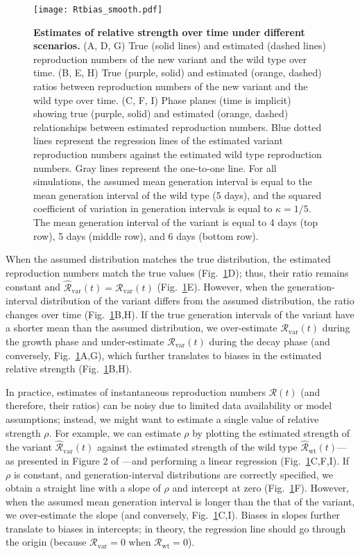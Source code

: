 \documentclass[12pt]{article}
\newcommand{\fref}[1]{Fig.~\ref{fig:#1}}
\newcommand{\vvvar}{\mathrm{var}}
\newcommand{\wwwt}{\mathrm{wt}}
\newcommand{\Rx}[1]{\ensuremath{{\mathcal R}_{#1}}\xspace}
\newcommand{\RR}{\ensuremath{{\mathcal R}}\xspace}
\newcommand{\Rw}{\Rx{\wwwt}}
\newcommand{\Rv}{\Rx{\vvvar}}
\begin{document}
\begin{figure}[!pht]
\begin{center}
\texttt{[image: Rtbias\_smooth.pdf]}
\caption{
\textbf{Estimates of relative strength over time under different scenarios.}
(A, D, G) True (solid lines) and estimated (dashed lines) reproduction numbers of the new variant and the wild type over time.
(B, E, H) True (purple, solid) and estimated (orange, dashed) ratios between reproduction numbers of the new variant and the wild type over time.
(C, F, I) Phase planes (time is implicit) showing true (purple, solid) and estimated (orange, dashed) relationships between estimated reproduction numbers.
Blue dotted lines represent the regression lines of the estimated variant reproduction numbers against the estimated wild type reproduction numbers.
Gray lines represent the one-to-one line.
For all simulations, the assumed mean generation interval is equal to the mean generation interval of the wild type (5 days), and the squared coefficient of variation in generation intervals is equal to $\kappa = 1/5$.
The mean generation interval of the variant is equal to 4 days (top row), 5 days (middle row), and 6 days (bottom row).
}
\label{fig:Rtbias}
\end{center}
\end{figure}

When the assumed distribution matches the true distribution, the estimated reproduction numbers match the true values (\fref{Rtbias}D); thus, their ratio remains constant and $\hat{\RR}_{\textrm{var}}(t)=\Rv(t)$ (\fref{Rtbias}E).
However, when the generation-interval distribution of the variant differs from the assumed distribution, the ratio changes over time (\fref{Rtbias}B,H).
If the true generation intervals of the variant have a shorter mean than the assumed distribution, we over-estimate $\Rv(t)$ during the growth phase and under-estimate $\Rv(t)$ during the decay phase (and conversely, \fref{Rtbias}A,G), which further translates to biases in the estimated relative strength (\fref{Rtbias}B,H).

In practice, estimates of instantaneous reproduction numbers $\RR(t)$ (and therefore, their ratios) can be noisy due to limited data availability or model assumptions;
instead, we might want to estimate a single value of relative strength $\rho$.
For example, we can estimate $\rho$ by plotting the estimated strength of the variant $\hat{\RR}_{\textrm{var}}(t)$ against the estimated strength of the wild type $\hat{\RR}_{\textrm{wt}}(t)$---as presented in Figure 2 of \cite{volz2021transmission}---and performing a linear regression (\fref{Rtbias}C,F,I).
If $\rho$ is constant, and generation-interval distributions are correctly specified, we obtain a straight line with a slope of $\rho$ and intercept at zero (\fref{Rtbias}F).
However, when the assumed mean generation interval is longer than the that of the variant, we over-estimate the slope (and conversely, \fref{Rtbias}C,I).
Biases in slopes further translate to biases in intercepts; in theory, the regression line should go through the origin (because $\Rv = 0$ when $\Rw = 0$).
\end{document}
